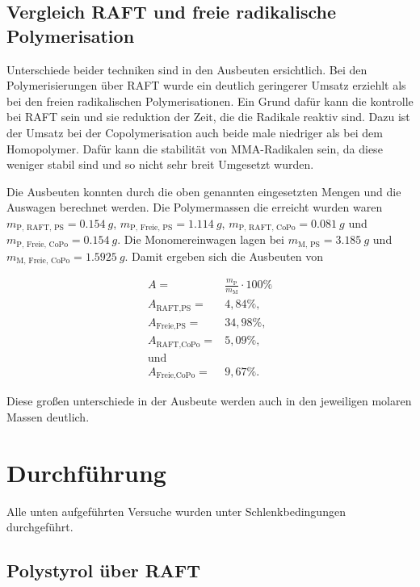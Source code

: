 \documentclass[10pt,a4paper,ngerman]{scrartcl}
\begin{document}
\subsection{Vergleich RAFT und freie radikalische Polymerisation}

		Unterschiede beider techniken sind in den Ausbeuten ersichtlich. Bei den Polymerisierungen über RAFT wurde ein deutlich geringerer Umsatz 
		erziehlt als bei den freien radikalischen Polymerisationen. Ein Grund dafür kann die kontrolle bei RAFT sein und sie reduktion der Zeit, 
		die die Radikale reaktiv sind. Dazu ist der Umsatz bei der Copolymerisation auch beide male niedriger als bei dem Homopolymer. Dafür kann die 
		stabilität von MMA-Radikalen sein, da diese weniger stabil sind und so nicht sehr breit Umgesetzt wurden.

		Die Ausbeuten konnten durch die oben genannten eingesetzten Mengen und die Auswagen berechnet werden. Die Polymermassen die erreicht 
		wurden waren $m_\text{P, RAFT, PS} = \SI{0,154}{g}$, $m_\text{P, Freie, PS} = \SI{1,114}{g}$, $m_\text{P, RAFT, CoPo} = \SI{0,081}{g}$ und $m_\text{P, Freie, CoPo} = \SI{0,154}{g}$.
		Die Monomereinwagen lagen bei $m_\text{M, PS} = \SI{3,185}{g}$ und $m_\text{M, Freie, CoPo} = \SI{1,5925}{g}$. Damit ergeben sich die Ausbeuten von


			\begin{eqnarray}
				A =& \frac{m_\text{P}}{m_\text{M}}\cdot 100\%\\
				A_\text{RAFT,PS} =& 4,84\% \text{,}\\
				A_\text{Freie,PS} =& 34,98\% \text{,}\\
				A_\text{RAFT,CoPo} =& 5,09\% \text{,}\\
				\text{und} \\
				A_\text{Freie,CoPo} =& 9,67\%	\text{.}		
			\end{eqnarray}

		Diese großen unterschiede in der Ausbeute werden auch in den jeweiligen molaren Massen deutlich. 


\section{Durchführung}

	Alle unten aufgeführten Versuche wurden unter Schlenkbedingungen durchgeführt.
	
	\subsection{Polystyrol über RAFT}
\end{document}
